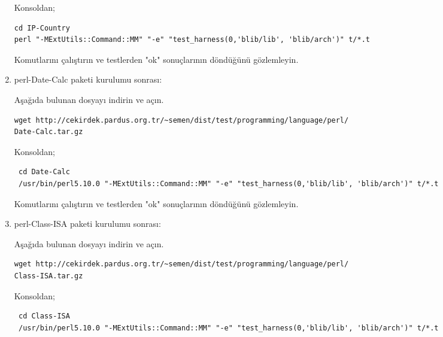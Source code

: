 \documentclass[a4paper,10pt]{article}
\begin{document}
\begin{enumerate}
Konsoldan;
\begin{verbatim}
cd IP-Country
perl "-MExtUtils::Command::MM" "-e" "test_harness(0,'blib/lib', 'blib/arch')" t/*.t
\end{verbatim}

Komutlarını çalıştırın ve testlerden "ok" sonuçlarının döndüğünü gözlemleyin.

% 
% 
% 

\item perl-Date-Calc paketi kurulumu sonrası:

Aşağıda bulunan dosyayı indirin ve açın.
\begin{verbatim}
wget http://cekirdek.pardus.org.tr/~semen/dist/test/programming/language/perl/
Date-Calc.tar.gz
\end{verbatim}

Konsoldan;
\begin{verbatim}
 cd Date-Calc
 /usr/bin/perl5.10.0 "-MExtUtils::Command::MM" "-e" "test_harness(0,'blib/lib', 'blib/arch')" t/*.t
\end{verbatim}

Komutlarını çalıştırın ve testlerden "ok" sonuçlarının döndüğünü gözlemleyin.

\item perl-Class-ISA paketi kurulumu sonrası:

Aşağıda bulunan dosyayı indirin ve açın.
\begin{verbatim}
wget http://cekirdek.pardus.org.tr/~semen/dist/test/programming/language/perl/
Class-ISA.tar.gz
\end{verbatim}

Konsoldan;
\begin{verbatim}
 cd Class-ISA
 /usr/bin/perl5.10.0 "-MExtUtils::Command::MM" "-e" "test_harness(0,'blib/lib', 'blib/arch')" t/*.t
\end{verbatim}


\end{enumerate}
\end{document}
